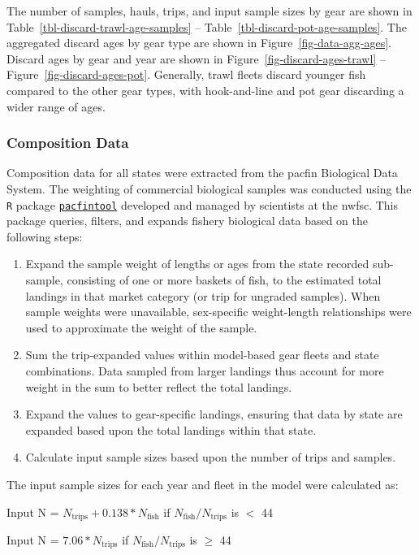 \documentclass[
  english,
]{article}
\begin{document}
The number of samples, hauls, trips, and input sample sizes by gear are
shown in Table~\ref{tbl-discard-trawl-age-samples} --
Table~\ref{tbl-discard-pot-age-samples}. The aggregated discard ages by
gear type are shown in Figure~\ref{fig-data-agg-ages}. Discard ages by
gear and year are shown in Figure~\ref{fig-discard-ages-trawl} --
Figure~\ref{fig-discard-ages-pot}. Generally, trawl fleets discard
younger fish compared to the other gear types, with hook-and-line and
pot gear discarding a wider range of ages.

\subsubsection{Composition Data}\label{fishery-bds-data}

Composition data for all states were extracted from the \gls{pacfin}
Biological Data System. The weighting of commercial biological samples
was conducted using the \texttt{R} package
\href{https://github.com/pfmc-assessments/pacfintools}{\texttt{pacfintool}}
developed and managed by scientists at the \gls{nwfsc}. This package
queries, filters, and expands fishery biological data based on the
following steps:

\begin{enumerate} 
\item Expand the sample weight of lengths or ages from the state recorded sub-sample, consisting of one or more baskets of fish, to the estimated total landings in that market category (or trip for ungraded samples). When sample weights were unavailable, sex-specific weight-length relationships were used to approximate the weight of the sample. 
\item Sum the trip-expanded values within model-based gear fleets and state combinations. Data sampled from larger landings thus account for more weight in the sum to better reflect the total landings.
\item Expand the values to gear-specific landings, ensuring that data by state are expanded based upon the total landings within that state.
\item Calculate input sample sizes based upon the number of trips and samples.
\end{enumerate}

The input sample sizes for each year and fleet in the model were
calculated as:

\begin{centering}

Input N = $N_{\text{trips}} + 0.138 * N_{\text{fish}}$ if $N_{\text{fish}}/N_{\text{trips}}$ is $<$ 44

Input N = $7.06 * N_{\text{trips}}$ if $N_{\text{fish}}/N_{\text{trips}}$ is $\geq$ 44

\end{centering}
\end{document}
